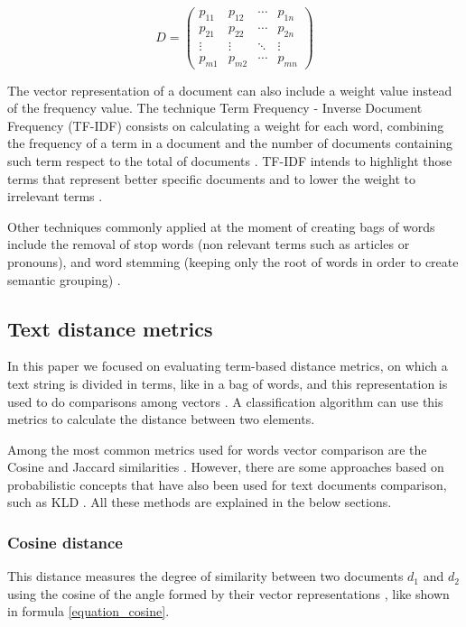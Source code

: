\documentclass[preprint,12pt,3p]{elsarticle}
\begin{document}
\begin{equation}
\label{equation_D}
D=\begin{pmatrix}
p_{11} & p_{12} & \cdots & p_{1n}\\ 
p_{21} & p_{22} & \cdots & p_{2n}\\ 
\vdots  & \vdots & \ddots  & \vdots \\ 
p_{m1} & p_{m2} & \cdots  & p_{mn}
\end{pmatrix}
\end{equation}

The vector representation of a document can also include a weight value instead of the frequency value. The technique Term Frequency - Inverse Document Frequency (TF-IDF) consists on calculating a weight for each word, combining the frequency of a term in a document and the number of documents containing such term respect to the total of documents \cite{srivastava2009text}. TF-IDF intends to highlight those terms that represent better specific documents and to lower the weight to irrelevant terms \cite{srivastava2009text}.\par

Other techniques commonly applied at the moment of creating bags of words include the removal of stop words (non relevant terms such as articles or pronouns), and word stemming (keeping only the root of words in order to create semantic grouping) \cite{srivastava2009text,uysal2014impact}.


\subsection{Text distance metrics}

In this paper we focused on evaluating term-based distance metrics, on which a text string is divided in terms, like in a bag of words, and this representation is used to do comparisons among vectors \cite{kocher2017distance}. A classification algorithm can use this metrics to calculate the distance between two elements.\par

Among the most common metrics used for words vector comparison are the Cosine and Jaccard similarities \cite{soto2015similarity,kocher2017distance}. However, there are some approaches based on probabilistic concepts that have also been used for text documents comparison, such as KLD \cite{bae2014computing,kocher2017distance}. All these methods are explained in the below sections.

\subsubsection{Cosine distance}
This distance measures the degree of similarity between two documents ${d_{1}}$ and ${d_{2}}$ using the cosine of the angle formed by their vector representations \cite{soto2015similarity}, like shown in formula \ref{equation_cosine}.
\end{document}
